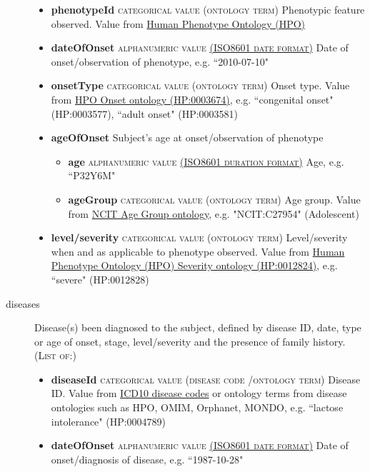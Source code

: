 \documentclass[a4paper, 10pt]{article}        %
\begin{document}
\begin{description}
	\begin{itemize}
			\item[] \textbf{phenotypeId} {\textsc{categorical value (ontology term)}} Phenotypic feature observed. Value from \href{http:purl.obolibrary.org/obo/HP_0000001}{Human Phenotype Ontology (HPO)} 
			\item[] \textbf{dateOfOnset} {\textsc{alphanumeric value \href{https://www.iso.org/iso-8601-date-and-time-format.html}{(ISO8601 date format)}}} Date of onset/observation of phenotype, e.g. ``2010-07-10"
			\item[] \textbf{onsetType} {\textsc{categorical value (ontology term)}}
 Onset type. Value from \href{http://purl.obolibrary.org/obo/HP_0003674}{HPO Onset ontology (HP:0003674)}, e.g. ``congenital onset" (HP:0003577), ``adult onset" (HP:0003581)
  			\item[] \textbf{ageOfOnset} Subject's age at onset/observation of phenotype
			\begin{itemize}
 			\item[] \textbf{age} {\textsc{alphanumeric value \href{https://www.iso.org/iso-8601-date-and-time-format.html}{(ISO8601 duration format)}}} Age, e.g. ``P32Y6M"
			\item[] \textbf{ageGroup} {\textsc{categorical value (ontology term)}} Age group. Value from \href{https://www.ebi.ac.uk/ols/ontologies/ncit/terms?iri=http%3A%2F%2Fpurl.obolibrary.org%2Fobo%2FNCIT_C20587}{NCIT Age Group ontology}, e.g. "NCIT:C27954" (Adolescent)
			\end{itemize}
			\item[] \textbf{level/severity}  {\textsc{categorical value (ontology term)}} Level/severity when and as applicable to phenotype observed. Value from \href{http://purl.obolibrary.org/obo/HP_0012824}{Human Phenotype Ontology (HPO) Severity ontology (HP:0012824)}, e.g. ``severe" (HP:0012828)
	\end{itemize}
	\item[diseases] Disease(s) been diagnosed to the subject, defined by disease ID, date, type or age of onset, stage, level/severity and the presence of family history. {\textsc{(List of:)}}
	\begin{itemize}
			\item[]  \textbf{diseaseId} {\textsc{categorical value (disease code /ontology term)}} Disease ID. Value from \href{https://www.who.int/classifications/icd/en/}{ICD10 disease codes} or ontology terms from disease ontologies such as HPO, OMIM, Orphanet, MONDO, e.g. ``lactose intolerance" (HP:0004789)
			\item[] \textbf{dateOfOnset} {\textsc{alphanumeric value \href{https://www.iso.org/iso-8601-date-and-time-format.html}{(ISO8601 date format)}}} Date of onset/diagnosis of disease, e.g. ``1987-10-28"

\end{itemize}
\end{description}
\end{document}
